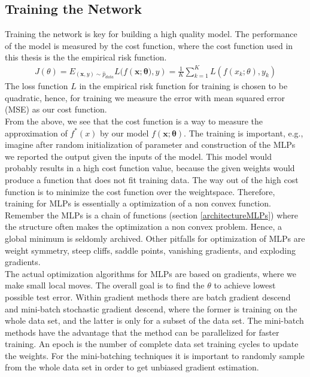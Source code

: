 \subsection{Training the Network}\label{trainNetwork}
Training the network is key for building a high quality model. The performance of the model is measured by the cost function, where the cost function used in this thesis is the the empirical risk function.
\begin{align*}
J(\theta)=E_{(\bm{x},y)\sim \hat{p}_{data}} L(f(\bm{x};\bm{\theta)},y)= \frac{1}{K}\sum_{k=1}^{K} L(f(x_k;\theta),y_k)
\end{align*}
The loss function $L$ in the empirical risk function for training is chosen to be quadratic, hence, for training we measure the error with mean squared error (MSE) as our cost function.\\

From the above, we see that the cost function is a way to measure the approximation of $f^*(x)$ by our model $f(\bm{x};\bm{\theta})$. The training is important, e.g., imagine after random initialization of parameter and construction of the MLPs we reported the output given the inputs of the model. This model would probably results in a high cost function value, because the given weights would produce a function that does not fit training data. The way out of the high cost function is to minimize the cost function over the weightspace. Therefore, training for MLPs is essentially a optimization of a non convex function. Remember the MLPs is a chain of functions (section \ref{architectureMLPs}) where the structure often makes the optimization a non convex problem. Hence, a global minimum is seldomly archived. Other pitfalls for optimization of MLPs are weight symmetry, steep cliffs, saddle points, vanishing gradients, and exploding gradients.\\

The actual optimization algorithms for MLPs are based on gradients, where we make small local moves. The overall goal is to find the $\theta$ to achieve lowest possible test error. Within gradient methods there are batch gradient descend and mini-batch stochastic gradient descend, where the former is training on the whole data set, and the latter is only for a subset of the data set. The mini-batch methods have the advantage that the method can be parallelized for faster training. An epoch is the number of complete data set training cycles to update the weights. For the mini-batching techniques it is important to randomly sample from the whole data set in order to get unbiased gradient estimation. \\

